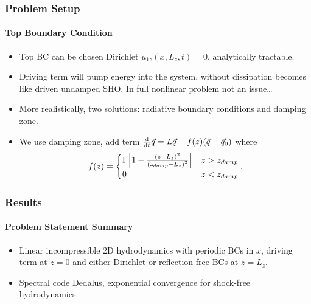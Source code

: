 \documentclass[dvipsnames]{beamer}
\newcommand*{\rd}[2]{\frac{\mathrm{d}#1}{\mathrm{d}#2}}
\DeclarePairedDelimiter\p{\lparen}{\rparen}
\DeclarePairedDelimiter\s{\lbrack}{\rbrack}
\begin{document}
\begin{frame}
    \frametitle{Problem Setup}
    \framesubtitle{Top Boundary Condition}

    \begin{itemize}
        \item Top BC can be chosen Dirichlet $u_{1z}(x, L_z, t) = 0$,
            analytically tractable.

        \item Driving term will pump energy into the system, without dissipation
            becomes like driven undamped SHO\@. In full nonlinear problem not an
            issue\dots

        \item More realistically, two solutions: radiative boundary conditions
            and damping zone.

        \item We use damping zone, add term $\rd{}{t}\vec{q} = L\vec{q}
            - f(z)\p*{\vec{q} - \vec{q}_0}$ where
            \begin{equation}
                f(z) =
                \begin{cases}
                    \Gamma \s*{
                        1 - \frac{\p*{z - L_z}^2}
                            {\p*{z_{damp} - L_z}^2}
                    }
                        & z > z_{damp}\\
                    0 & z < z_{damp}
                \end{cases}.
            \end{equation}
    \end{itemize}
\end{frame}

\begin{frame}
    \frametitle{Results}
    \framesubtitle{Problem Statement Summary}

    \begin{itemize}
        \item Linear incompressible 2D hydrodynamics with periodic BCs in $x$,
            driving term at $z = 0$ and either Dirichlet or reflection-free BCs
            at $z = L_z$.

        \item Spectral code Dedalus, exponential convergence for shock-free
            hydrodynamics.
    \end{itemize}
\end{frame}
\end{document}
